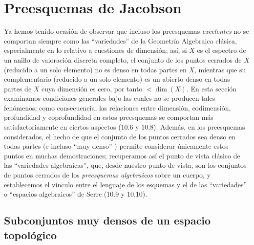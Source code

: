 \section{Preesquemas de Jacobson}
\label{section:IV.10}

Ya hemos tenido ocasión de observar  que incluso los
preesquemas \emph{excelentes}  no se comportan siempre como las
``variedades'' de la Geometría Algebraica clásica, especialmente en lo relativo
a cuestiones de dimensión; así, si $X$ es el espectro de un anillo de valoración
discreta completo, el conjunto de los puntos cerrados de $X$ (reducido a un solo
elemento) no es denso en todas partes en $X$, mientras que su complementario
(reducido a un solo elemento) es un abierto denso en todas partes de $X$ cuya
dimensión es cero, por tanto $<\dim(X)$. En esta sección examinamos condiciones
generales bajo las cuales no se producen tales fenómenos; como consecuencia,
las relaciones entre dimensión, codimensión, profundidad y coprofundidad en
estos preesquemas se comportan más satisfactoriamente en ciertos aspectos (10.6
y 10.8). Además, en los preesquemas considerados, el hecho de que el conjunto
de los puntos cerrados sea denso en todas partes (e incluso ``muy denso''
) permite considerar únicamente estos puntos en muchas
demostraciones; recuperamos así el punto de vista clásico de las ``variedades
algebraicas'', que, desde nuestro punto de vista, son los conjuntos de puntos
cerrados de los \emph{preesquemas algebraicos} sobre un cuerpo, y establecemos
el vínculo entre el lenguaje de los esquemas y el de las ``variedades'' o
``espacios algebraicos'' de Serre (10.9 y 10.10).

\subsection{Subconjuntos muy densos de un espacio topológico}
\label{subsection:IV.10.1}

